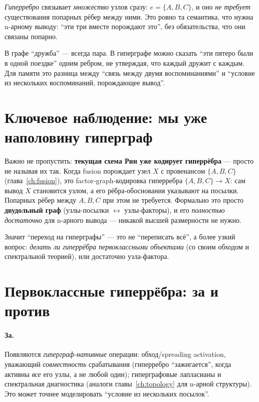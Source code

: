 \emph{Гиперребро} связывает \emph{множество} узлов сразу:
$e=\{A,B,C\}$, и оно \emph{не требует} существования попарных рёбер между
ними. Это ровно та семантика, что нужна n-арному выводу: ``эти три вместе
порождают это'', без обязательства, что они связаны попарно.

\begin{intuition}
В графе ``дружба'' --- всегда пара. В гиперграфе можно сказать ``эти пятеро
были в одной поездке'' одним ребром, не утверждая, что каждый дружит с
каждым. Для памяти это разница между ``связь между двумя воспоминаниями'' и
``условие из нескольких воспоминаний, порождающее вывод''.
\end{intuition}

\section{Ключевое наблюдение: мы уже наполовину гиперграф}

Важно не пропустить: \textbf{текущая схема Рин уже кодирует гиперрёбра} ---
просто не называя их так. Когда fusion порождает узел $X$ с провенансом
$\{A,B,C\}$ (глава~\ref{ch:fusion}), это factor-graph-кодировка гиперребра
$\{A,B,C\}\to X$: сам вывод $X$ становится узлом, а его рёбра-обоснования
указывают на посылки. Попарных рёбер между $A,B,C$ при этом не требуется.
Формально это просто \textbf{двудольный граф} (узлы-посылки $\leftrightarrow$
узлы-факторы), и его \emph{полностью достаточно} для n-арного вывода ---
никакой высшей размерности не нужно.

Значит ``переход на гиперграфы'' --- это не ``переписать всё'', а более узкий
вопрос: \emph{делать ли гиперрёбра первоклассными объектами} (со своим
обходом и спектральной теорией), или достаточно узла-фактора.

\section{Первоклассные гиперрёбра: за и против}

\paragraph{За.} Появляются \emph{гиперграф-нативные} операции:
обход/spreading activation, уважающий \emph{совместность} срабатывания
(гиперребро ``зажигается'', когда активны \emph{все} его узлы, а не любой
один); гиперграфовые лапласианы и спектральная диагностика (аналоги
главы~\ref{ch:topology} для n-арной структуры). Это может точнее
моделировать ``условие из нескольких посылок''.

